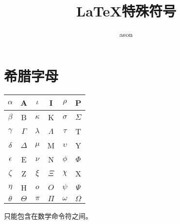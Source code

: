 \documentclass[10pt,a4paper]{article}
\author{ason}
\title{LaTeX特殊符号}
\begin{document}
	\maketitle
	\tableofcontents
	\pagebreak
	\section{希腊字母}
	\begin{center}
		\begin{tabular}{|c|c|c|c|c|c|}
		\hline
		$\alpha$ 	& A 		& $\iota$ 	&I 				& $\rho$	&P 			\\
		\hline
		$\beta$		&B  		&$\kappa$  	&K 				&$\sigma$	&$\Sigma$ 	\\
		\hline
		$\gamma$	&$\Gamma$  	&$\lambda$  & $\Lambda$ 	&$\tau$		&T			\\
		\hline
		$\delta$	&$\Delta$  	& $\mu$ 	&M  			&$\upsilon$	&Y			\\
		\hline
		$\epsilon$	&E  		&$\nu$  	&N  			&$\phi$		&$\Phi$		\\
		\hline
		$\zeta$		&Z  		&$\xi$  	&$\Xi$  		&$\chi$		&X			\\
		\hline
		$\eta$		&H  		&$o$  		&$O$  			&$\psi$		&$\Psi$		\\
		\hline
		$\theta$	&$\Theta$  	&$\pi$  	&$\Pi$  		&$\omega$	&$\Omega$	\\
		\hline
	\end{tabular}
	\end{center}

	只能包含在数学命令符之间。
\end{document}
